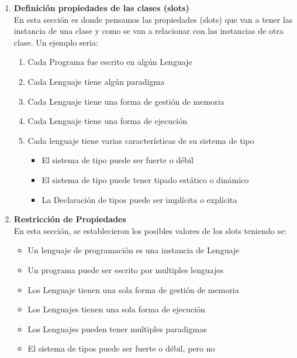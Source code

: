 \documentclass[12pt, titlepage, a4paper]{article}
\begin{document}
\begin{enumerate}
{           Ademas, también se tuvo en consideración la idea 
           de subclases y superclases (Como puede ser en el caso 
           de las Características)}
    \item {\textbf{Definición propiedades de las clases (slots)}\\
           En esta sección es donde pensamos las propiedades (slots) 
           que van a tener las instancia de una clase y como 
           se van a relacionar con las instancias de otra clase. 
           Un ejemplo seria:
           \begin{enumerate}
                \item {Cada Programa fue escrito en algún Lenguaje}
                \item {Cada Lenguaje tiene algún paradigma}
                \item {Cada Lenguaje tiene una forma de gestión de memoria}
                \item {Cada Lenguaje tiene una forma de ejecución}
                \item Cada lenguaje tiene varias características de su sistema de tipo
                \begin{itemize}
                    \item {El sistema de tipo puede ser fuerte o débil}
                    \item {El sistema de tipo puede tener tipado estático o dinámico}
                    \item {La Declaración de tipos puede ser implícita o explícita}
                \end{itemize}
           \end{enumerate}}
    \item {\textbf{Restricción de Propiedades}\\
          En esta sección, se establecieron los posibles valores de 
          los slots teniendo se: 
          \begin{itemize}
            \item {Un lenguaje de programación es una instancia de Lenguaje}
            \item {Un programa puede ser escrito por multiples lenguajes}
            \item {Los Lenguaje tienen una sola forma de gestión de memoria}
            \item {Los Lenguajes tienen una sola forma de ejecución}
            \item {Los Lenguajes pueden tener multiples paradigmas}
            \item {El sistema de tipos puede ser fuerte o débil, pero no 
}
\end{itemize}}
\end{enumerate}
\end{document}

